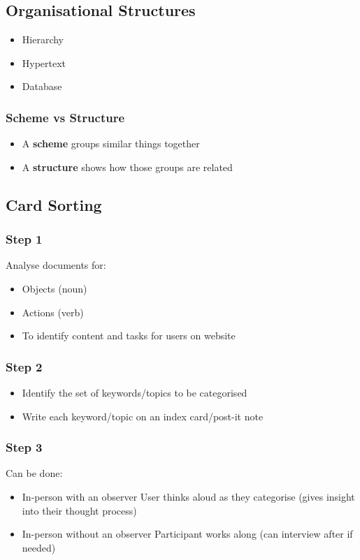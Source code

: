\subsection{Organisational Structures}
\begin{itemize}
	\item Hierarchy
	\item Hypertext
	\item Database	
\end{itemize}

\subsubsection{Scheme vs Structure}
\begin{itemize}
	\item A \textbf{scheme} groups similar things together
	\item A \textbf{structure} shows how those groups are related	
\end{itemize}

\subsection{Card Sorting}
\subsubsection{Step 1}
Analyse documents for:
\begin{itemize}
	\item Objects (noun)
	\item Actions (verb)
	\item To identify content and tasks for users  on website	
\end{itemize}
\subsubsection{Step 2}
\begin{itemize}
	\item Identify the set of keywords/topics to be categorised
	\item Write each keyword/topic on an index card/post-it note	
\end{itemize}
\subsubsection{Step 3}
Can be done:
\begin{itemize}
	\item In-person with an observer
	\subitem User thinks aloud as they categorise (gives insight into their thought process)
	\item In-person without an observer	
	\subitem Participant works along (can interview after if needed)
\end{itemize}

